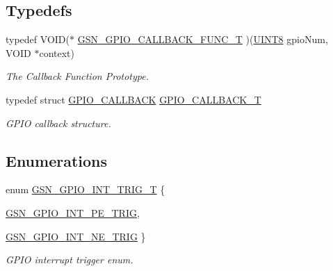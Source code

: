 \subsection*{Typedefs}
\begin{DoxyCompactItemize}
\item 
typedef VOID($\ast$ \hyperlink{a00648_gae6698a8151cd85d7dac2358199ed7c6e}{GSN\_\-GPIO\_\-CALLBACK\_\-FUNC\_\-T} )(\hyperlink{a00660_gab27e9918b538ce9d8ca692479b375b6a}{UINT8} gpioNum, VOID $\ast$context)
\begin{DoxyCompactList}\small\item\em The Callback Function Prototype. \end{DoxyCompactList}\item 
typedef struct \hyperlink{a00018}{GPIO\_\-CALLBACK} \hyperlink{a00648_ga8646a0bb88c00e7b2463984ae3466ac7}{GPIO\_\-CALLBACK\_\-T}
\begin{DoxyCompactList}\small\item\em GPIO callback structure. \end{DoxyCompactList}\end{DoxyCompactItemize}
\subsection*{Enumerations}
\begin{DoxyCompactItemize}
\item 
enum \hyperlink{a00648_gaff716caaf31f66ce12b16f91bb47c06a}{GSN\_\-GPIO\_\-INT\_\-TRIG\_\-T} \{ \par
\hyperlink{a00648_ggaff716caaf31f66ce12b16f91bb47c06aa52a5bb11ea0fbbaeb8c0328e374c2170}{GSN\_\-GPIO\_\-INT\_\-PE\_\-TRIG}, 
\par
\hyperlink{a00648_ggaff716caaf31f66ce12b16f91bb47c06aa82a5e5bf12f8a3a17cd11b729b845b7c}{GSN\_\-GPIO\_\-INT\_\-NE\_\-TRIG}
 \}
\begin{DoxyCompactList}\small\item\em GPIO interrupt trigger enum. \end{DoxyCompactList}\end{DoxyCompactItemize}
